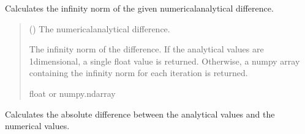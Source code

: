 \documentclass[a4paper,11pt,english,openany]{sphinxmanual}
\begin{document}
\begin{fulllineitems}
\begin{fulllineitems}
\begin{quote}
\begin{description}
\end{description}\end{quote}

\end{fulllineitems}


\begin{fulllineitems}
\label{\detokenize{api/spyice.utils.error_norms:spyice.utils.error_norms.ErrorNorms.infinity_norm}}
\pysigstartsignatures
{}
\pysigstopsignatures
\sphinxAtStartPar
Calculates the infinity norm of the given numerical\sphinxhyphen{}analytical difference.
\begin{quote}\begin{description}
\sphinxAtStartPar
{} () \textendash{} The numerical\sphinxhyphen{}analytical difference.

\sphinxAtStartPar
The infinity norm of the difference. If the analytical values
are 1\sphinxhyphen{}dimensional, a single float value is returned. Otherwise, a numpy array
containing the infinity norm for each iteration is returned.

\sphinxAtStartPar
float or numpy.ndarray

\end{description}\end{quote}

\end{fulllineitems}


\begin{fulllineitems}
\label{\detokenize{api/spyice.utils.error_norms:spyice.utils.error_norms.ErrorNorms.numerical_analytical_diff}}
\pysigstartsignatures
{}
\pysigstopsignatures
\sphinxAtStartPar
Calculates the absolute difference between the analytical values and the numerical values.
\begin{quote}\begin{description}
\sphinxAtStartPar
{}


\end{description}
\end{quote}
\end{fulllineitems}
\end{fulllineitems}
\end{document}
